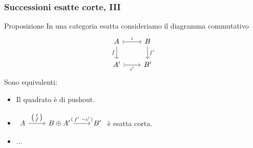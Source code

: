 \documentclass{beamer}
\begin{document}
\begin{frame}[fragile]
  \frametitle{Successioni esatte corte, III}

  \begin{block}{Proposizione}
    In una categoria esatta consideriamo il diagramma commutativo
    \[
      \begin{tikzcd}
        A \ar["{f}", d, swap] \ar["{i}", rightarrowtail, r] & B \ar["{f'}", d] \\
        A' \ar["{i'}", rightarrowtail, r, swap] & B'
      \end{tikzcd}
    \]
    Sono equivalenti:
    \begin{itemize}
    \item Il quadrato è di pushout.
    \item \(
      \begin{tikzcd}[ampersand replacement=\&]
        A \ar["{\begin{psmallmatrix} i \\ f \end{psmallmatrix}}", r] \&
        B \oplus A' \ar["{\begin{psmallmatrix} f' &
            -i' \end{psmallmatrix}}", r] \& B'
      \end{tikzcd}
      \) è esatta corta.
    \item ...
    \end{itemize}
  \end{block}
  
\end{frame}
\end{document}
